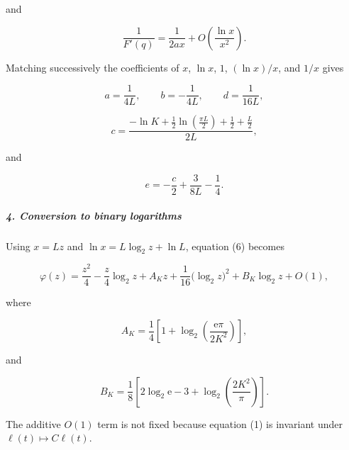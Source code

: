 and

\[
\frac{1}{F'(q)} = \frac{1}{2ax} +O\!\left(\frac{\ln x}{x^2}\right). \tag{9}
\]

Matching successively the coefficients of $x$, $\ln x$, $1$, $(\ln x)/x$, and $1/x$ gives

\[
a=\frac{1}{4L}, \qquad b=-\frac{1}{4L}, \qquad d=\frac{1}{16L}, \tag{10}
\]

\[
c= \frac{ -\ln K+\frac12\ln\!\left(\frac{\pi L}{2}\right) +\frac12+\frac{L}{2} }{2L}, \tag{11}
\]

and

\[
e=-\frac{c}{2}+\frac{3}{8L}-\frac14. \tag{12}
\]

\subparagraph*{4. Conversion to binary logarithms}

Using $x=Lz$ and $\ln x=L\log_2z+\ln L$, equation (6) becomes

\[
\varphi(z) = \frac{z^2}{4} -\frac{z}{4}\log_2z +A_Kz +\frac{1}{16}\bigl(\log_2z\bigr)^2 +B_K\log_2z +O(1), \tag{13}
\]

where

\[
A_K = \frac14 \left[ 1+\log_2\!\left(\frac{\mathrm e\pi}{2K^2}\right) \right], \tag{14}
\]

and

\[
B_K = \frac18 \left[ 2\log_2\mathrm e-3 +\log_2\!\left(\frac{2K^2}{\pi}\right) \right]. \tag{15}
\]

The additive $O(1)$ term is not fixed because equation (1) is invariant under $\ell(t)\mapsto C\ell(t)$.

